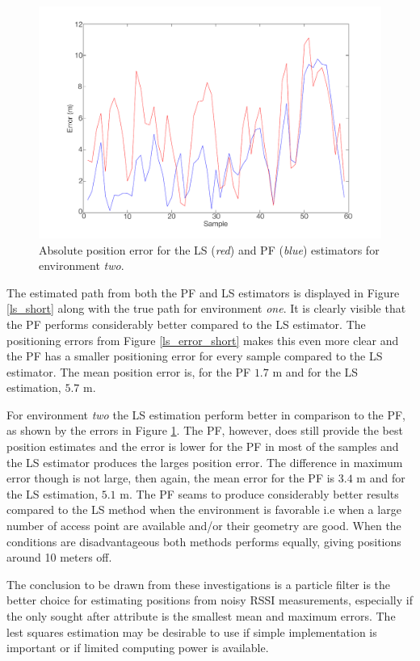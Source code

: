 \documentclass{LTHthesis}
\begin{document}
%
\begin{figure}[!hbt]

\includegraphics[width=1\textwidth ]{images/pure_rssi/ls_error_medium}
\caption{Absolute position error for the LS (\emph{red}) and PF (\emph{blue}) estimators for environment \emph{two}.}\label{ls_error_medium}
\end{figure}

The estimated path from both the PF and LS estimators is displayed in Figure \ref{ls_short} along with the true path for environment \emph{one}. It is clearly visible that the PF performs considerably better compared to the LS estimator. The positioning errors from Figure \ref{ls_error_short} makes this even more clear and the PF has a smaller positioning error for every sample compared to the LS estimator. The mean position error is, for the PF  $1.7$ m and for the LS estimation, $5.7$ m. 

For environment \emph{two} the LS estimation perform better in comparison to the PF, as shown by the errors in Figure \ref{ls_error_medium}. The PF, however, does still provide the best position estimates and the error is lower for the PF in most of the samples and the LS estimator produces the larges position error. The difference in maximum error though is not large, then again, the mean error for the PF is $3.4$ m and for the LS estimation, $5.1$ m. The PF seams to produce considerably better results compared to the LS method when the environment is favorable i.e when a large number of access point are available and/or their geometry are good. When the conditions are disadvantageous both methods performs equally, giving positions around 10 meters off.

The conclusion to be drawn from these investigations is a particle filter is the better choice for estimating positions from noisy RSSI measurements, especially if the only sought after attribute is the smallest mean and maximum errors. The lest squares estimation may be desirable to use if simple implementation is important or if limited computing power is available.
\end{document}
